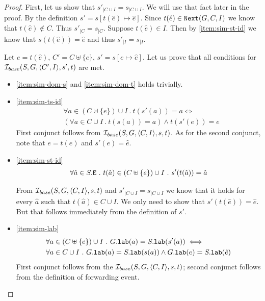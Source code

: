 \documentclass[12pt]{article}
\begin{document}
\begin{proof}
  First, let us show that $s'_{|C \cup I} = s_{|C \cup I}$.
  We will use that fact later in the proof.
  By the definition $s' = s[t(\hat{e}) \mapsto \hat{e}]$.
  Since $t(\hat{e}) \in {\mathtt{Next}}(G, C, I)$ we know that $t(\hat{e}) \not\in C$.
  Thus $s'_{|C} = s_{|C}$.
  Suppose $t(\hat{e}) \in I$. Then by \ref{item:sim-st-id}
  we know that $s(t(\hat{e})) = \hat{e}$ and thus $s'_{|I} = s_{|I}$.
  
  Let $e = t(\hat{e})$, $C' = C \uplus \{e\}$, $s' = s[e \mapsto \hat{e}]$.
  Let us prove that all conditions for $\mathcal{I}_{base}(S, G, \langle C', I \rangle, s', t)$ are met.
  \begin{itemize}

  \item \ref{item:sim-dom-s} and \ref{item:sim-dom-t} holds trivially.

  \item \ref{item:sim-ts-id} \\
    \begin{equation}
      \begin{split}
        & \forall{a \in (C \uplus \{e\}) \cup I} ~.~ t(s'(a)) = a \iff \\
        & (\forall{a \in C \cup I} ~.~ t(s(a)) = a) \wedge t(s'(e)) = e
      \end{split}
    \end{equation}
    First conjunct follows from $\mathcal{I}_{base}(S, G, \langle C, I \rangle, s, t)$.
    As for the second conjunct, note that $e = t(\hat{e})$ and $s'(e) = \hat{e}$.

  \item \ref{item:sim-st-id} \\
    \begin{equation}
      \begin{split}
        \forall{\hat{a} \in S.{\mathtt{E}}} ~.~ t(\hat{a}) \in (C \uplus \{e\}) \cup I ~.~
          s'(t(\hat{a})) = \hat{a}
      \end{split}
    \end{equation}

    From $\mathcal{I}_{base}(S, G, \langle C, I \rangle, s, t)$ and $s'_{|C \cup I} = s_{|C \cup I}$
    we know that it holds for every $\hat{a}$
    such that $t(\hat{a}) \in C \cup I$.
    We only need to show that $s'(t(\hat{e})) = \hat{e}$.
    But that follows immediately from the definition of $s'$.

  \item \ref{item:sim-lab} \\
    \begin{equation}
      \begin{split}
        & \forall{a \in (C \uplus \{e\}) \cup I} ~.~ G.{\mathtt{lab}}(a) = S.{\mathtt{lab}}(s'(a)) \iff \\
        & \forall{a \in C \cup I} ~.~
          G.{\mathtt{lab}}(a) = S.{\mathtt{lab}}(s(a)) \wedge G.{\mathtt{lab}}(e) = S.{\mathtt{lab}}(\hat{e})
      \end{split}
    \end{equation}
    First conjunct follows from the $\mathcal{I}_{base}(S, G, \langle C, I \rangle, s, t)$;
    second conjunct follows from the definition of forwarding event.


\end{itemize}
\end{proof}
\end{document}
